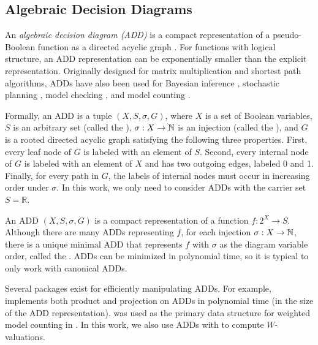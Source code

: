 





\subsection{Algebraic Decision Diagrams}

An \emph{algebraic decision diagram (ADD)} is a compact representation of a pseudo-Boolean function as a directed acyclic graph \cite{bahar1997algebraic}.
For functions with logical structure, an ADD representation can be exponentially smaller than the explicit representation.
Originally designed for matrix multiplication and shortest path algorithms, ADDs have also been used for Bayesian inference \cite{chavira2007compiling,gogate2011approximation}, stochastic planning \cite{hoey1999spudd}, model checking \cite{kwiatkowska2007stochastic}, and model counting \cite{fargier2014knowledge,dudek2020addmc}.

Formally, an ADD is a tuple $(X, S, \sigma, G)$, where $X$ is a set of Boolean variables, $S$ is an arbitrary set (called the ), $\sigma: X \to \mathbb{N}$ is an injection (called the ), and $G$ is a rooted directed acyclic graph satisfying the following three properties.
First, every leaf node of $G$ is labeled with an element of $S$.
Second, every internal node of $G$ is labeled with an element of $X$ and has two outgoing edges, labeled 0 and 1.
Finally, for every path in $G$, the labels of internal nodes must occur in increasing order under $\sigma$.
In this work, we only need to consider ADDs with the carrier set $S = \mathbb{R}$.

An ADD $(X, S, \sigma, G)$ is a compact representation of a function $f: 2^X \to S$.
Although there are many ADDs representing $f$, for each injection $\sigma: X \to \mathbb{N}$, there is a unique minimal ADD that represents $f$ with $\sigma$ as the diagram variable order, called the .
ADDs can be minimized in polynomial time, so it is typical to only work with canonical ADDs.

Several packages exist for efficiently manipulating ADDs.
For example, \cudd{} \cite{somenzi2015cudd} implements both product and projection on ADDs in polynomial time (in the size of the ADD representation).
\cudd{} was used as the primary data structure for weighted model counting in \cite{dudek2020addmc}.
In this work, we also use ADDs with \cudd{} to compute $W$-valuations.

